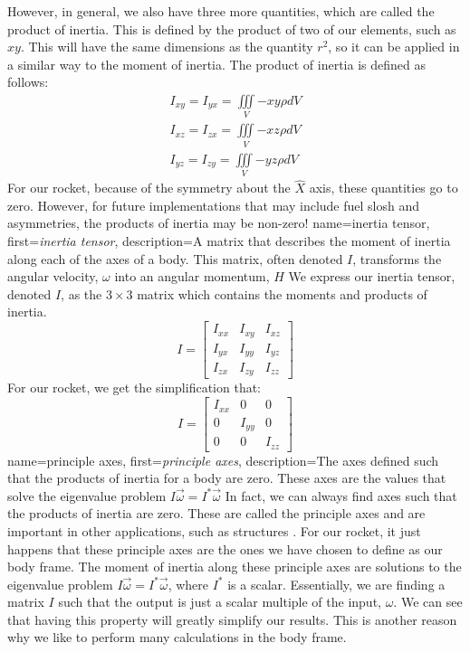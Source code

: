 \documentclass[12pt]{report}
\begin{document}
However, in general, we also have three more quantities, which are called the product of inertia. This is defined by the product of two of our elements, such as $xy$. This will have the same dimensions as the quantity $r^2$, so it can be applied in a similar way to the moment of inertia. The product of inertia is defined as follows:
\begin{gather}
    I_{xy}=I_{yx}=\iiint\limits_V{-xy\rho}{dV}\\
    I_{xz}=I_{zx}=\iiint\limits_V{-xz\rho}{dV}\\
    I_{yz}=I_{zy}=\iiint\limits_V{-yz\rho}{dV}
\end{gather}
For our rocket, because of the symmetry about the $\hat{X}$ axis, these quantities go to zero. However, for future implementations that may include fuel slosh and asymmetries, the products of inertia may be non-zero!
{
    name={inertia tensor},
    first=\textit{inertia tensor},
    description={A matrix that describes the moment of inertia along each of the axes of a body. This matrix, often denoted $I$, transforms the angular velocity, $\omega$ into an angular momentum, $H$}
}
We express our \gls{inertia tensor}, denoted $I$, as the $3\times3$ matrix which contains the moments and products of inertia.
$$I=\begin{bmatrix}
    I_{xx}&I_{xy}&I_{xz}\\
    I_{yx}&I_{yy}&I_{yz}\\
    I_{zx}&I_{zy}&I_{zz}
\end{bmatrix}$$
For our rocket, we get the simplification that:
$$I=\begin{bmatrix}
    I_{xx}&0&0\\
    0&I_{yy}&0\\
    0&0&I_{zz}
\end{bmatrix}$$
{
    name={principle axes},
    first=\textit{principle axes},
    description={The axes defined such that the products of inertia for a body are zero. These axes are the values that solve the eigenvalue problem $I\vec{\omega}=I^*\vec{\omega}$}
}
In fact, we can always find axes such that the products of inertia are zero. These are called the \gls{principle axes} and are important in other applications, such as structures \cite{baker_statics_2020}. For our rocket, it just happens that these \gls{principle axes} are the ones we have chosen to define as our body frame. The moment of inertia along these principle axes are solutions to the eigenvalue problem $I\vec{\omega}=I^*\vec{\omega}$, where $I^*$ is a scalar. Essentially, we are finding a matrix $I$ such that the output is just a scalar multiple of the input, $\omega$. We can see that having this property will greatly simplify our results. This is another reason why we like to perform many calculations in the body frame.
\end{document}
